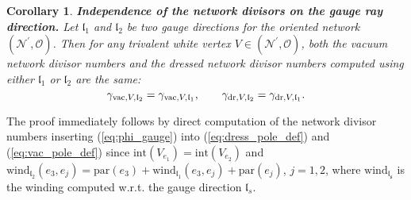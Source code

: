 \documentclass[11pt]{amsart}
\theoremstyle{plain}
\numberwithin{equation}{section}
\newtheorem{corollary}[theorem]{Corollary}
\begin{document}
\begin{corollary}\label{cor:indep_gauge}\textbf{Independence of the network divisors on the gauge ray direction.}
Let ${\mathfrak l}_1$ and ${\mathfrak l}_2$ be two gauge directions for the oriented network $({\mathcal N}^{\prime}, \mathcal O)$.
Then for any trivalent white vertex $V\in ({\mathcal N}^{\prime}, \mathcal O)$, both the vacuum network divisor numbers and the dressed network divisor numbers 
computed using either ${\mathfrak l}_1$ or ${\mathfrak l}_2$ are the same:
\begin{equation}\label{eq:inep_gauge}
\gamma_{\textup{\scriptsize vac},V,\mathfrak l_2} = \gamma_{\textup{\scriptsize vac},V,\mathfrak l_1}, \quad\quad\gamma_{\textup{\scriptsize dr},V,\mathfrak l_2} = \gamma_{\textup{\scriptsize dr},V,\mathfrak l_1}.
\end{equation}
\end{corollary}

The proof immediately follows by direct computation of the network divisor numbers inserting (\ref{eq:phi_gauge}) into (\ref{eq:dress_pole_def}) and (\ref{eq:vac_pole_def}) since $\mbox{int}(V_{e_1})=\mbox{int}(V_{e_2})$ and $\mbox{wind}_{\mathfrak{l_2}} (e_3,e_j)=
\mbox{par}(e_3)+\mbox{wind}_{\mathfrak{l_1}} (e_3,e_j)+\mbox{par}(e_j)$, $j=1,2$, where $\mbox{wind}_{\mathfrak{l_s}}$ is the winding computed w.r.t. the gauge direction $\mathfrak{l}_s$.
\end{document}
